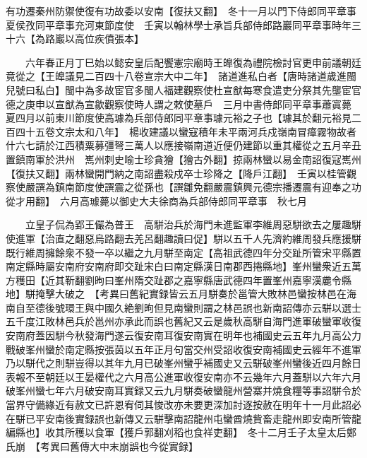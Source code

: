 有功遷秦州防禦使復有功故委以安南【復扶又翻】　冬十一月以門下侍郎同平章事夏侯孜同平章事充河東節度使　壬寅以翰林學士承旨兵部侍郎路巖同平章事時年三十六【為路巖以高位疾僨張本】

　　六年春正月丁巳始以懿安皇后配饗憲宗廟時王皥復為禮院檢討官更申前議朝廷竟從之【王皥議見二百四十八卷宣宗大中二年】　諸道進私白者【唐時諸道歲進閩兒號曰私白】閩中為多故宦官多閩人福建觀察使杜宣猷每寒食遣吏分祭其先壟宦官德之庚申以宣猷為宣歙觀察使時人謂之敕使墓戶　三月中書侍郎同平章事蕭寘薨　夏四月以前東川節度使高璩為兵部侍郎同平章事璩元裕之子也【璩其於翻元裕見二百四十五卷文宗太和八年】　楊收建議以蠻寇積年未平兩河兵戍嶺南冒瘴霧物故者什六七請於江西積粟募彊弩三萬人以應接嶺南道近便仍建節以重其權從之五月辛丑置鎮南軍於洪州　嶲州刺史喻士珍貪獪【獪古外翻】掠兩林蠻以易金南詔復寇嶲州【復扶又翻】兩林蠻開門納之南詔盡殺戍卒士珍降之【降戶江翻】　壬寅以桂管觀察使嚴譔為鎮南節度使譔震之從孫也【譔雛免翻嚴震鎮興元德宗播遷震有迎奉之功從才用翻】　六月高璩薨以御史大夫徐商為兵部侍郎同平章事　秋七月

　　立皇子侃為郢王儼為普王　高駢治兵於海門未進監軍李維周惡駢欲去之屢趣駢使進軍【治直之翻惡烏路翻去羌呂翻趣讀曰促】駢以五千人先濟約維周發兵應援駢既行維周擁餘衆不發一卒以繼之九月駢至南定【高祖武德四年分交趾所管宋平縣置南定縣時屬安南府安南府即交趾宋白曰南定縣漢日南郡西捲縣地】峯州蠻衆近五萬方穫田【近其靳翻劉昫曰峯州隋交趾郡之嘉寧縣唐武德四年置峯州嘉寧漢麊令縣地】駢掩擊大破之　【考異曰舊紀實録皆云五月駢奏於邕管大敗林邑蠻按林邑在海南自至德後號環王與中國久絶劉昫但見南蠻則謂之林邑誤也新南詔傳亦云駢以選士五千度江敗林邑兵於邕州亦承此而誤也舊紀又云是歲秋高駢自海門進軍破蠻軍收復安南府蓋因駢今秋發海門遂云復安南耳復安南實在明年也補國史云五年九月高公力戰破峯州蠻於南定縣按張茵以五年正月句當交州受詔收復安南補國史云經年不進軍乃以駢代之則駢豈得以其年九月已破峯州蠻乎補國史又云駢破峯州蠻後近四月餘日表報不至朝廷以王晏權代之六月高公進軍收復安南亦不云幾年六月蓋駢以六年六月破峯州蠻七年六月破安南耳實録又云九月駢奏破蠻龍州營寨并燒食糧等事詔駢令於當界守備緣近有赦文已許恩宥伺其悛改亦未要更深加討逐按赦在明年十一月此詔必在駢已平安南後實録誤也新傳又云駢擊南詔龍州屯蠻酋燒貲畜走龍州即安南所管龍編縣也】收其所穫以食軍【獲戶郭翻刈稻也食祥吏翻】　冬十二月壬子太皇太后鄭氏崩　【考異曰舊傳大中末崩誤也今從實録】

